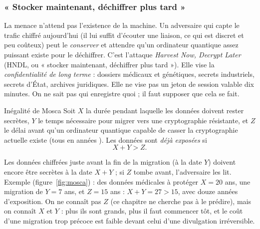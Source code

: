 \subsubsection{« Stocker maintenant, déchiffrer plus tard »}

La menace n'attend pas l'existence de la machine. Un adversaire qui capte le trafic chiffré aujourd'hui (il lui
suffit d'écouter une liaison, ce qui est discret et peu coûteux) peut le \emph{conserver} et attendre qu'un
ordinateur quantique assez puissant existe pour le déchiffrer. C'est l'attaque \emph{Harvest Now, Decrypt Later}
(HNDL, ou « stocker maintenant, déchiffrer plus tard »). Elle vise la \emph{confidentialité de long terme} :
dossiers médicaux et génétiques, secrets industriels, secrets d'État, archives juridiques. Elle ne vise pas un
jeton de session valable dix minutes. On ne sait pas qui enregistre quoi ; il faut supposer que cela se fait.

\begin{resultat}{Inégalité de Mosca}
Soit $X$ la durée pendant laquelle les données doivent rester secrètes, $Y$ le temps nécessaire pour migrer vers une
cryptographie résistante, et $Z$ le délai avant qu'un ordinateur quantique capable de casser la cryptographie actuelle existe
(tous en années \parencite{mosca2018}). Les données sont \emph{déjà exposées} si
\[
  X+Y>Z.
\]
\end{resultat}

Les données chiffrées juste avant la fin de la migration (à la date $Y$) doivent encore être secrètes à la date $X+Y$ ;
si $Z$ tombe avant, l'adversaire les lit. Exemple (figure~\ref{fig:mosca}) : des données médicales à protéger
$X=20$ ans, une migration de $Y=7$ ans, et $Z=15$ ans : $X+Y=27>15$, avec douze années d'exposition. On ne connaît pas
$Z$ (ce chapitre ne cherche pas à le prédire), mais on connaît $X$ et $Y$ : plus ils sont grands, plus il faut
commencer tôt, et le coût d'une migration trop précoce est faible devant celui d'une divulgation irréversible.

